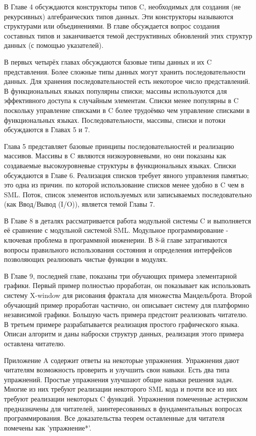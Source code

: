 В Главе 4 обсуждаются конструкторы типов C, необходимых для создания (не рекурсивных) алгебраических типов данных. Эти конструкторы называются структурами или объединениями. В главе обсуждается вопрос создания составных типов и заканчивается темой деструктивных обновлений этих структур данных (с помощью указателей).

В первых четырёх главах обсуждаются базовые типы данных и их C представления. Более сложные типы данных могут хранить последовательности данных. Для хранения последовательностей есть некоторое число представлений. В функциональных языках популярны списки; массивы используются для эффективного доступа к случайным элементам. Списки менее популярны в C поскольку управление списками в C более трудоёмко чем управление списками в функциональных языках. Последовательности, массивы, списки и потоки обсуждаются в Главах 5 и 7.

Глава 5 представляет базовые принципы последовательностей и реализацию массивов. Массивы в C являются низкоуровневыми, но они показаны как создаваемые высокоуровневые структуры в функциональных языках. Списки обсуждаются в Главе 6. Реализация списков требует явного управления памятью; это одна из причин. по которой использование списков менее удобно в C чем в SML. Поток, список элементов используемых или записываемых последовательно (как Ввод/Вывод (I/O)), является темой Главы 7.

В Главе 8 в деталях рассматривается работа модульной системы C и выполняется её сравнение с модульной системой SML. Модульное программирование - ключевая проблема в программной инженерии. В 8-й главе затрагиваются вопросы правильного использования состояния и определения интерфейсов позволяющих реализовать чистые функции в модулях.

В Главе 9, последней главе, показаны три обучающих примера элементарной графики. Первый пример полностью проработан, он показывает как использовать систему X-window для рисования фрактала для множества Мандельброта. Второй обучающий пример проработан частично, он описывает систему для платформно независимой графики. Большую часть примера предстоит реализовать читателю. В третьем примере разрабатывается реализация простого графического языка. Описан алгоритм и даны наброски структур данных, реализация этого примера оставлена читателю.

Приложение A содержит ответы на некоторые упражнения. Упражнения дают читателям возможность проверить и улучшить свои навыки. Есть два типа упражнений. Простые упражнения улучшают общие навыки решения задач. Многие из них требуют реализации некоторого SML кода и почти все из них требуют реализации некоторых C функций. Упражнения помеченные астериском предназначены для читателей, заинтересованных в фундаментальных вопросах программирования. Все доказательства теорем оставленные для читателя помечены как 'упражнение*'.

